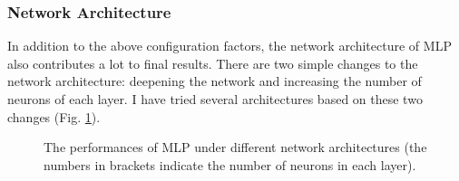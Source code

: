 \documentclass[12pt,a4paper]{article}
\theoremstyle{definition}
\begin{document}
\subsubsection{Network Architecture}

In addition to the above configuration factors, the network architecture of MLP also contributes a lot to final results. There are two simple changes to the network architecture: deepening the network and increasing the number of neurons of each layer. I have tried several architectures based on these two changes (Fig. \ref{fig:mlp-archi}).

\begin{figure}[H]
	\centering
	\caption{The performances of MLP under different network architectures (the numbers in brackets indicate the number of neurons in each layer).}
	\label{fig:mlp-archi}
\end{figure}
\end{document}
